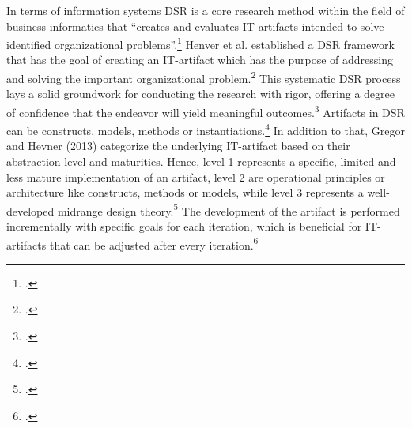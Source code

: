 In terms of information systems \ac{DSR} is a core research method within the field of business informatics that ``creates and evaluates \ac{IT}-artifacts intended to solve identified organizational problems''.\footcite[77]{hevnerDesignScienceInformation2004a}
Henver et al. established a DSR framework that has the goal of creating an \ac{IT}-artifact which has the purpose of addressing and solving the important organizational problem.\footcite[82]{hevnerDesignScienceInformation2004a}
This systematic \ac{DSR} process lays a solid groundwork for conducting the research with rigor, offering a degree of confidence that the endeavor will yield meaningful outcomes.\footcite[cf.][368]{baskervilleDesignScienceResearch2018}
Artifacts in \ac{DSR} can be constructs, models, methods or instantiations.\footcite[77]{hevnerDesignScienceInformation2004a}
In addition to that, Gregor and Hevner (2013) categorize the underlying \ac{IT}-artifact based on their abstraction level and maturities.
Hence, level 1 represents a specific, limited and less mature implementation of an artifact, level 2 are operational principles or architecture like constructs, methods or models, while level 3 represents a well-developed midrange design theory.\footcite[cf.][342]{gregorPositioningPresentingDesign2013}
The development of the artifact is performed incrementally with specific goals for each iteration, which is beneficial for \ac{IT}-artifacts that can be adjusted after every iteration.\footcite[cf.][343]{gregorPositioningPresentingDesign2013}

